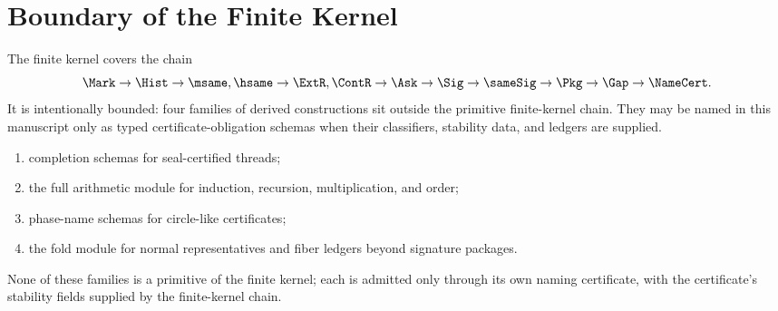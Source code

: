 \chapter{Boundary of the Finite Kernel}
\label{ch:core-finite-kernel-boundary}

The finite kernel covers the chain
$$
\Mark \to \Hist \to \msame, \hsame \to \ExtR, \ContR \to \Ask \to \Sig \to \sameSig \to \Pkg \to \Gap \to \NameCert.
$$
It is intentionally bounded: four families of derived constructions sit outside the primitive finite-kernel chain. They may be named in this manuscript only as typed certificate-obligation schemas when their classifiers, stability data, and ledgers are supplied.
\begin{enumerate}
  \item completion schemas for seal-certified threads;
  \item the full arithmetic module for induction, recursion, multiplication, and order;
  \item phase-name schemas for circle-like certificates;
  \item the fold module for normal representatives and fiber ledgers beyond signature packages.
\end{enumerate}
None of these families is a primitive of the finite kernel; each is admitted only through its own naming certificate, with the certificate's stability fields supplied by the finite-kernel chain.
